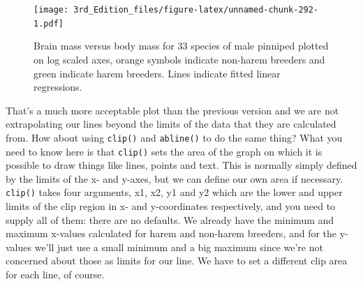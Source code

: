 \documentclass[
]{book}
\newenvironment{Shaded}{\begin{snugshade}}{\end{snugshade}}
\newcommand{\DataTypeTok}[1]{\textcolor[rgb]{0.13,0.29,0.53}{#1}}
\newcommand{\DecValTok}[1]{\textcolor[rgb]{0.00,0.00,0.81}{#1}}
\newcommand{\KeywordTok}[1]{\textcolor[rgb]{0.13,0.29,0.53}{\textbf{#1}}}
\newcommand{\NormalTok}[1]{#1}
\newcommand{\OperatorTok}[1]{\textcolor[rgb]{0.81,0.36,0.00}{\textbf{#1}}}
\newcommand{\StringTok}[1]{\textcolor[rgb]{0.31,0.60,0.02}{#1}}
\begin{document}
\begin{Shaded}
\end{Shaded}

\begin{figure}
\centering
\texttt{[image: 3rd\_Edition\_files/figure-latex/unnamed-chunk-292-1.pdf]}
\caption{\label{fig:unnamed-chunk-292}Brain mass versus body mass for 33 species of male pinniped plotted on log scaled axes, orange symbols indicate non-harem breeders and green indicate harem breeders. Lines indicate fitted linear regressions.}
\end{figure}

That's a much more acceptable plot than the previous version and we are not extrapolating our lines beyond the limits of the data that they are calculated from. How about using \texttt{clip()} and \texttt{abline()} to do the same thing? What you need to know here is that \texttt{clip()} sets the area of the graph on which it is possible to draw things like lines, points and text. This is normally simply defined by the limits of the x- and y-axes, but we can define our own area if necessary. \texttt{clip()} takes four arguments, x1, x2, y1 and y2 which are the lower and upper limits of the clip region in x- and y-coordinates respectively, and you need to supply all of them: there are no defaults. We already have the minimum and maximum x-values calculated for harem and non-harem breeders, and for the y-values we'll just use a small minimum and a big maximum since we're not concerned about those as limits for our line. We have to set a different clip area for each line, of course.
\end{document}
